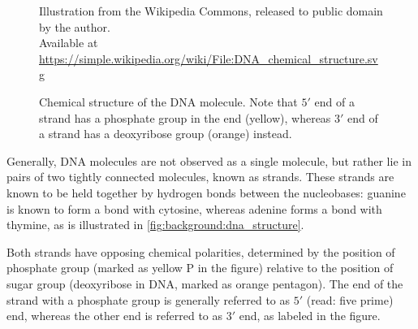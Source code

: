 \documentclass[parskip]{cs4rep}
\begin{document}
\begin{figure}[p]
    \centering
                 {Illustration from the Wikipedia Commons, released to public domain by the author.\\
                  Available at \url{https://simple.wikipedia.org/wiki/File:DNA_chemical_structure.svg}}
    \caption{Chemical structure of the DNA molecule. Note that $5'$ end of a strand has a phosphate group in the end (yellow), whereas $3'$ end of a strand has a deoxyribose group (orange) instead.}
    \label{fig:background:dna_structure}
\end{figure}

Generally, DNA molecules are not observed as a single molecule, but rather lie in pairs of two tightly connected molecules, known as strands. These strands are known to be held together by hydrogen bonds between the nucleobases: guanine is
known to form a bond with cytosine, whereas adenine forms a bond with thymine, as is illustrated in \autoref{fig:background:dna_structure}.

Both strands have opposing chemical polarities, determined by the position
of phosphate group (marked as yellow P in the figure) relative to the position of sugar group (deoxyribose in DNA, marked as orange pentagon). The end of the strand with a phosphate group is generally referred to as $5'$ (read: five prime) end, whereas the other end is referred to as $3'$ end, as labeled in the figure.
\end{document}
